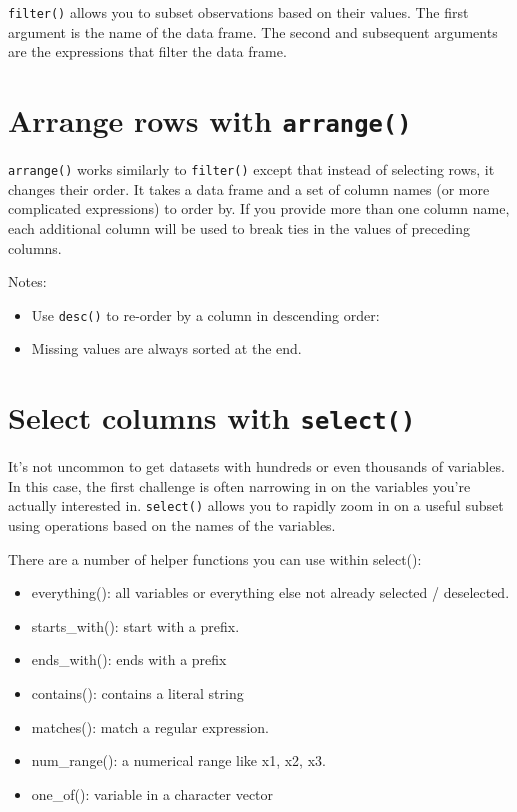 \documentclass[]{book}
\providecommand{\tightlist}{%
  \setlength{\itemsep}{0pt}\setlength{\parskip}{0pt}}
\theoremstyle{definition}
\theoremstyle{definition}
\theoremstyle{definition}
\theoremstyle{remark}
\begin{document}
\texttt{filter()} allows you to subset observations based on their
values. The first argument is the name of the data frame. The second and
subsequent arguments are the expressions that filter the data frame.

\hypertarget{arrange-rows-with-arrange}{%
\section{\texorpdfstring{Arrange rows with
\texttt{arrange()}}{Arrange rows with arrange()}}\label{arrange-rows-with-arrange}}

\texttt{arrange()} works similarly to \texttt{filter()} except that
instead of selecting rows, it changes their order. It takes a data frame
and a set of column names (or more complicated expressions) to order by.
If you provide more than one column name, each additional column will be
used to break ties in the values of preceding columns.

Notes:

\begin{itemize}
\tightlist
\item
  Use \texttt{desc()} to re-order by a column in descending order:
\item
  Missing values are always sorted at the end.
\end{itemize}

\hypertarget{select-columns-with-select}{%
\section{\texorpdfstring{Select columns with
\texttt{select()}}{Select columns with select()}}\label{select-columns-with-select}}

It's not uncommon to get datasets with hundreds or even thousands of
variables. In this case, the first challenge is often narrowing in on
the variables you're actually interested in. \texttt{select()} allows
you to rapidly zoom in on a useful subset using operations based on the
names of the variables.

There are a number of helper functions you can use within select():

\begin{itemize}
\tightlist
\item
  everything(): all variables or everything else not already selected /
  deselected.
\item
  starts\_with(): start with a prefix.
\item
  ends\_with(): ends with a prefix
\item
  contains(): contains a literal string
\item
  matches(): match a regular expression.
\item
  num\_range(): a numerical range like x1, x2, x3.
\item
  one\_of(): variable in a character vector
\end{itemize}
\end{document}
